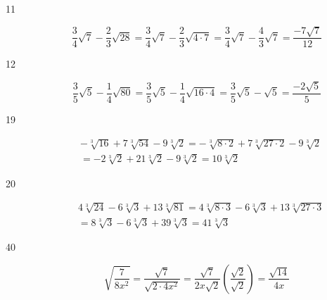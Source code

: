 \documentclass[fleqn,addpoints]{exam}
\begin{document}
\begin{description}

\item[11]
\[
  \frac{3}{4}\sqrt{7} - \frac{2}{3}\sqrt{28} = \frac{3}{4}\sqrt{7} - \frac{2}{3}\sqrt{4 \cdot 7} 
  = \frac{3}{4}\sqrt{7} - \frac{4}{3}\sqrt{7}  = \frac{-7\sqrt{7}}{12}
\]

\item[12]
\[
  \frac{3}{5}\sqrt{5} - \frac{1}{4}\sqrt{80} = \frac{3}{5}\sqrt{5} - \frac{1}{4}\sqrt{16 \cdot 4}
  = \frac{3}{5}\sqrt{5} - \sqrt{5} = \frac{-2\sqrt{5}}{5}
\]



\item[19]
\begin{align*}
  & -\sqrt[3]{16} +7\sqrt[3]{54} - 9\sqrt[3]{2} = -\sqrt[3]{8 \cdot 2} +7\sqrt[3]{27 \cdot 2} - 9\sqrt[3]{2} \\
  &= -2\sqrt[3]{2} + 21\sqrt[3]{2} - 9\sqrt[3]{2} = 10\sqrt[3]{2}
\end{align*}

\item[20]
\begin{align*}
  & 4\sqrt[3]{24} - 6\sqrt[3]{3} + 13\sqrt[3]{81} = 4\sqrt[3]{8 \cdot 3} - 6\sqrt[3]{3} + 13\sqrt[3]{27 \cdot 3} \\
  &= 8\sqrt[3]{3} - 6\sqrt[3]{3} + 39\sqrt[3]{3} = 41\sqrt[3]{3}
\end{align*}

\item[40]
\[
  \sqrt{\frac{7}{8x^2}} = \frac{\sqrt{7}}{\sqrt{2 \cdot 4x^2}} 
  = \frac{\sqrt{7}}{2x\sqrt{2}} \left( \frac{\sqrt{2}}{\sqrt{2}} \right) = \frac{\sqrt{14}}{4x}
\]


\end{description}
\end{document}
